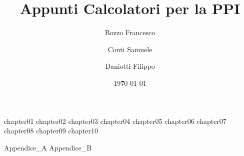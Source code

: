\documentclass[
	,a4paper
	,12pt
	,oneside
]{book}
\author{Bozzo Francesco \and Conti Samuele \and Daniotti Filippo}
\title{Appunti Calcolatori per la PPI}
\date{\today}
\begin{document}
\frontmatter

	\maketitle
	\tableofcontents

\mainmatter

	{chapter01}
	{chapter02}
	{chapter03}
	{chapter04}
	{chapter05}
	{chapter06} %
	{chapter07}
	{chapter08}
	{chapter09}
	{chapter10}

\backmatter

	\appendix
	{Appendice_A}
	{Appendice_B}
\end{document}
